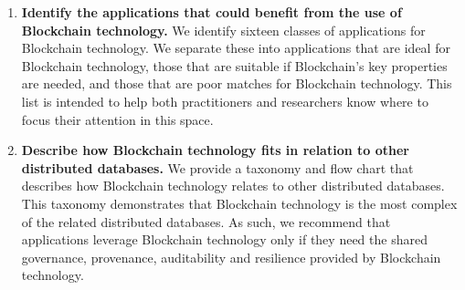 \begin{enumerate}
	\item \textbf{Identify the applications that could benefit from the use of Blockchain technology.}
	We identify sixteen classes of applications for Blockchain technology.
	We separate these into applications that are ideal for Blockchain technology, those that are suitable if Blockchain's key properties are needed, and those that are poor matches for Blockchain technology.
	This list is intended to help both practitioners and researchers know where to focus their attention in this space.
	
	\item \textbf{Describe how Blockchain technology fits in relation to other distributed databases.}
	We provide a taxonomy and flow chart that describes how Blockchain technology relates to other distributed databases.
	This taxonomy demonstrates that Blockchain technology is the most complex of the related distributed databases.
	As such, we recommend that applications leverage Blockchain technology only if they need the shared governance, provenance, auditability and resilience provided by Blockchain technology.
	
\end{enumerate}
